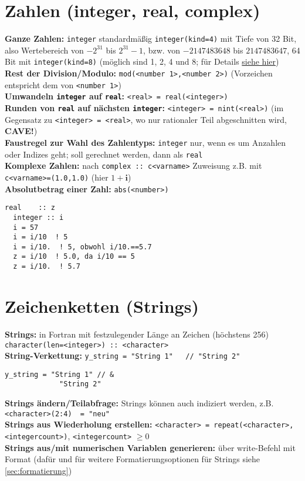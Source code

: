 \documentclass[a4paper, twocolumn]{scrarticle}
\begin{document}
\section{Zahlen (integer, real, complex)}
\textbf{Ganze Zahlen:} \lstinline|integer| standardmäßig \lstinline|integer(kind=4)| mit Tiefe von 32 Bit, also Wertebereich von $-2^{31}$ bis $2^{31}-1$, bzw. von $-2147483648$ bis $2147483647$, 64 Bit mit \lstinline|integer(kind=8)| (möglich sind 1, 2, 4 und 8; für Details \href{http://earth.uni-muenster.de/~joergs/doc/f90/unix-um/dfum_034.html}{siehe hier})\\
\textbf{Rest der Division/Modulo:} \lstinline|mod(<number 1>,<number 2>)| (Vorzeichen entspricht dem von \lstinline|<number 1>|) \\
\textbf{Umwandeln \lstinline|integer| auf \lstinline|real|:} \lstinline|<real> = real(<integer>)|\\
\textbf{Runden von \lstinline|real| auf nächsten \lstinline|integer|:} \lstinline|<integer> = nint(<real>)| (im Gegensatz zu \lstinline|<integer> = <real>|, wo nur rationaler Teil abgeschnitten wird, \textbf{CAVE!})\\
\textbf{Faustregel zur Wahl des Zahlentyps:} \lstinline|integer| nur, wenn es um Anzahlen oder Indizes geht; soll gerechnet werden, dann als \lstinline|real|\\
\textbf{Komplexe Zahlen:} nach \lstinline|complex :: c<varname>| Zuweisung z.B. mit \lstinline|c<varname>=(1.0,1.0)| (hier $1+\textbf{i}$)\\
\textbf{Absolutbetrag einer Zahl:} \lstinline|abs(<number>)|
\begin{lstlisting}[caption={\bfseries Beispiel: CAVE - implizite Umwandlungen bei Division}]
  real    :: z
  integer :: i
  i = 57
  i = i/10  ! 5
  i = i/10.  ! 5, obwohl i/10.==5.7
  z = i/10  ! 5.0, da i/10 == 5
  z = i/10.  ! 5.7
\end{lstlisting}

\section{Zeichenketten (Strings)}
\textbf{Strings:} in Fortran mit festzulegender Länge an Zeichen  (höchstens 256) \lstinline|character(len=<integer>) :: <character>|\\
\textbf{String-Verkettung:} \lstinline|y_string = "String 1"   // "String 2"|
\begin{lstlisting}[caption={\bfseries Beispiel: String-Verkettung über Code-Zeilen hinweg},label=lst:stringkette]
  y_string = "String 1" // &
             "String 2"
\end{lstlisting}
\textbf{Strings ändern/Teilabfrage:} Strings können auch indiziert werden, z.B. \lstinline|<character>(2:4)  = "neu"|\\
\textbf{Strings aus Wiederholung erstellen:} \lstinline|<character> = repeat(<character>, <integercount>)|, \lstinline|<integercount>| $\geq 0$\\
\textbf{Strings aus/mit numerischen Variablen generieren:} über write-Befehl mit Format (dafür und für weitere Formatierungsoptionen für Strings siehe \cref{sec:formatierung})
\end{document}
